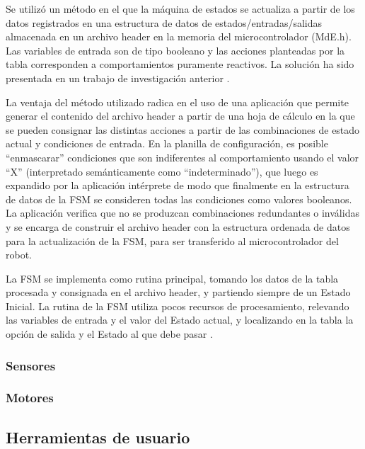 Se utilizó un método en el que la máquina de estados se actualiza a partir de los datos registrados en  una estructura de datos de estados/entradas/salidas almacenada en un archivo header en la memoria del microcontrolador (MdE.h). Las variables de entrada son de tipo booleano y las acciones planteadas por la tabla corresponden a comportamientos puramente reactivos. La solución ha sido presentada en un trabajo de investigación anterior \citep{planilla}.

La ventaja del método utilizado radica en el uso de una aplicación que permite generar el contenido del archivo header a partir de una hoja de cálculo en la que se pueden consignar las distintas acciones a partir de las combinaciones de estado actual y condiciones de entrada. En la planilla de configuración, es posible “enmascarar” condiciones que son indiferentes al comportamiento  usando el valor “X” (interpretado semánticamente como “indeterminado”), que luego es expandido por la aplicación intérprete de modo que finalmente en la estructura de datos de la FSM se consideren todas las condiciones como valores booleanos. 
La aplicación verifica que no se produzcan combinaciones redundantes o inválidas y se encarga de construir el archivo header con la estructura ordenada de datos para la actualización de la FSM,  para ser transferido al microcontrolador del robot.

La FSM se implementa como rutina principal, tomando los datos de la tabla procesada y consignada en el archivo header, y partiendo siempre de un Estado Inicial. La rutina de la FSM utiliza pocos recursos de procesamiento, relevando las variables de entrada y el valor del Estado actual, y localizando en la tabla la opción de salida y el Estado al que debe pasar .
		
		
		
		\subsubsection{Sensores}
		\subsubsection{Motores}


\subsection{Herramientas de usuario}





